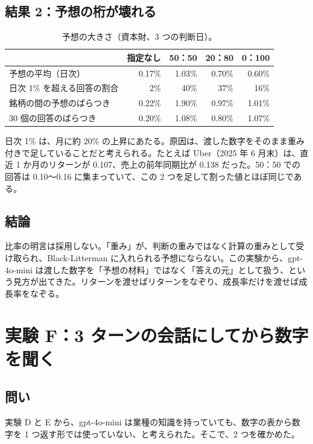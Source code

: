 \documentclass[xelatex,ja=standard,jafont=hiragino-pron,a4paper,10pt]{bxjsreport}
\begin{document}
\section{結果 2：予想の桁が壊れる}

\begin{table}[htbp]
\centering
\caption{予想の大きさ（資本財、3 つの判断日）。}
\small
\begin{tabular}{lrrrr}
\toprule
 & 指定なし & 50：50 & 20：80 & 0：100 \\
\midrule
予想の平均（日次） & 0.17\% & 1.03\% & 0.70\% & 0.60\% \\
日次 1\% を超える回答の割合 & 2\% & 40\% & 37\% & 16\% \\
銘柄の間の予想のばらつき & 0.22\% & 1.90\% & 0.97\% & 1.01\% \\
30 個の回答のばらつき & 0.20\% & 1.08\% & 0.80\% & 1.07\% \\
\bottomrule
\end{tabular}
\end{table}

日次 1\% は、月に約 20\% の上昇にあたる。原因は、渡した数字をそのまま重み付きで足していることだと考えられる。たとえば Uber（2025 年 6 月末）は、直近 1 か月のリターンが 0.107、売上の前年同期比が 0.138 だった。50：50 での回答は 0.10〜0.16 に集まっていて、この 2 つを足して割った値とほぼ同じである。

\section{結論}

比率の明言は採用しない。「重み」が、判断の重みではなく計算の重みとして受け取られ、Black-Litterman に入れられる予想にならない。この実験から、gpt-4o-mini は渡した数字を「予想の材料」ではなく「答えの元」として扱う、という見方が出てきた。リターンを渡せばリターンをなぞり、成長率だけを渡せば成長率をなぞる。

\chapter{実験 F：3 ターンの会話にしてから数字を聞く}\label{ch:expF}

\section{問い}

実験 D と E から、gpt-4o-mini は業種の知識を持っていても、数字の表から数字を 1 つ返す形では使っていない、と考えられた。そこで、2 つを確かめた。
\end{document}
